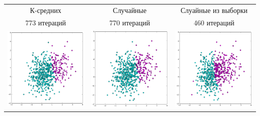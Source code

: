 \documentclass[12pt, a4paper]{article}
\begin{document}
			\begin{center}
			\begin{tabular}{c c c}
				\hline
				К-средних & Случайные & Слуайные из выборки \\

				773 итераций & 770 итераций & 460 итераций \\

				\hline

				\includegraphics[width=5cm]{4par_kminit_em_bad.png} &
				\includegraphics[width=5cm]{4par_rdinit_EM_bad.png} &
				\includegraphics[width=5cm]{4par_rdinitx_EM_bad.png} \\


\end{tabular}
\end{center}
\end{document}

